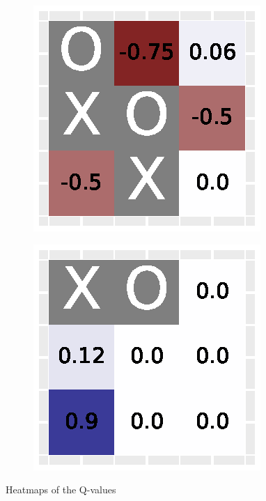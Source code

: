 \documentclass[10pt]{IEEEtran}
\begin{document}
\begin{figure}[H]
\begin{subfigure}[b]{0.32\linewidth}
         \includegraphics[width=\linewidth]{code/figures/heatmap_1.eps}
         \caption{}
         \label{fig_heatmap_2}
     \end{subfigure}
     \hfill
     \begin{subfigure}[b]{0.32\linewidth}
         \centering
         \includegraphics[width=\linewidth]{code/figures/heatmap_2.eps}
         \caption{}
         \label{fig_heatmap_3}
     \end{subfigure}
        \caption{Heatmaps of the Q-values}
        \label{plot_question_10}
\end{figure}
\end{document}
